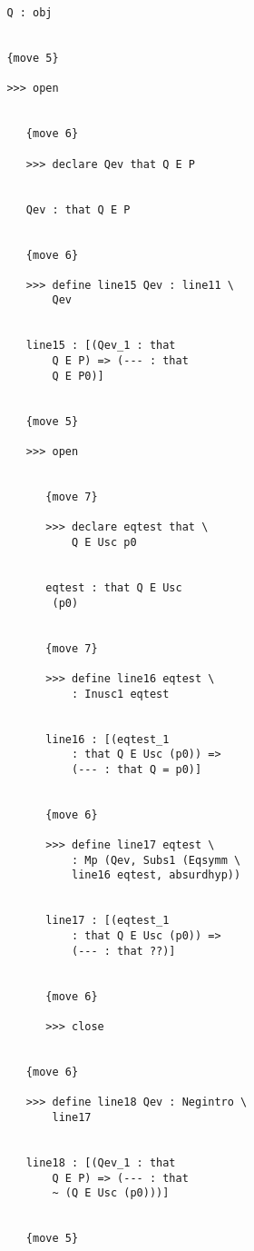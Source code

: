 \documentclass[12pt]{article}
\begin{document}
\begin{verbatim}
               Q : obj


               {move 5}

               >>> open


                  {move 6}

                  >>> declare Qev that Q E P


                  Qev : that Q E P


                  {move 6}

                  >>> define line15 Qev : line11 \
                      Qev


                  line15 : [(Qev_1 : that 
                      Q E P) => (--- : that 
                      Q E P0)]


                  {move 5}

                  >>> open


                     {move 7}

                     >>> declare eqtest that \
                         Q E Usc p0


                     eqtest : that Q E Usc 
                      (p0)


                     {move 7}

                     >>> define line16 eqtest \
                         : Inusc1 eqtest


                     line16 : [(eqtest_1 
                         : that Q E Usc (p0)) => 
                         (--- : that Q = p0)]


                     {move 6}

                     >>> define line17 eqtest \
                         : Mp (Qev, Subs1 (Eqsymm \
                         line16 eqtest, absurdhyp))


                     line17 : [(eqtest_1 
                         : that Q E Usc (p0)) => 
                         (--- : that ??)]


                     {move 6}

                     >>> close


                  {move 6}

                  >>> define line18 Qev : Negintro \
                      line17


                  line18 : [(Qev_1 : that 
                      Q E P) => (--- : that 
                      ~ (Q E Usc (p0)))]


                  {move 5}


\end{verbatim}
\end{document}
